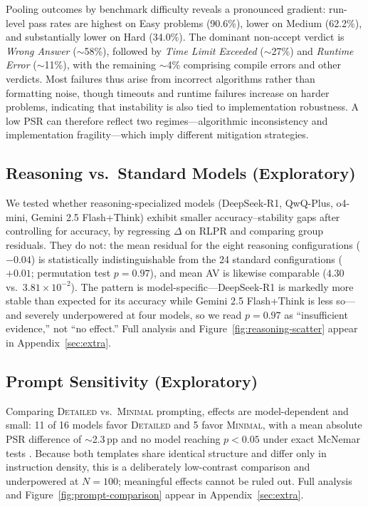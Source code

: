 \documentclass{article}
\begin{document}
Pooling outcomes by benchmark difficulty reveals a pronounced gradient: run-level pass rates are highest on Easy problems (90.6\%), lower on Medium (62.2\%), and substantially lower on Hard (34.0\%). The dominant non-accept verdict is \emph{Wrong Answer} ($\sim$58\%), followed by \emph{Time Limit Exceeded} ($\sim$27\%) and \emph{Runtime Error} ($\sim$11\%), with the remaining $\sim$4\% comprising compile errors and other verdicts. Most failures thus arise from incorrect algorithms rather than formatting noise, though timeouts and runtime failures increase on harder problems, indicating that instability is also tied to implementation robustness. A low PSR can therefore reflect two regimes---algorithmic inconsistency and implementation fragility---which imply different mitigation strategies.

\subsection{Reasoning vs.\ Standard Models (Exploratory)}
We tested whether reasoning-specialized models (DeepSeek-R1, QwQ-Plus, o4-mini, Gemini 2.5 Flash+Think) exhibit smaller accuracy--stability gaps after controlling for accuracy, by regressing $\Delta$ on RLPR and comparing group residuals. They do not: the mean residual for the eight reasoning configurations ($-0.04$) is statistically indistinguishable from the 24 standard configurations ($+0.01$; permutation test $p=0.97$), and mean AV is likewise comparable ($4.30$ vs.\ $3.81 \times 10^{-2}$). The pattern is model-specific---DeepSeek-R1 is markedly more stable than expected for its accuracy while Gemini 2.5 Flash+Think is less so---and severely underpowered at four models, so we read $p=0.97$ as ``insufficient evidence,'' not ``no effect.'' Full analysis and Figure~\ref{fig:reasoning-scatter} appear in Appendix~\ref{sec:extra}.

\subsection{Prompt Sensitivity (Exploratory)}
Comparing \textsc{Detailed} vs.\ \textsc{Minimal} prompting, effects are model-dependent and small: 11 of 16 models favor \textsc{Detailed} and 5 favor \textsc{Minimal}, with a mean absolute PSR difference of $\sim$2.3\,pp and no model reaching $p<0.05$ under exact McNemar tests \citep{zhuo2024prosa}. Because both templates share identical structure and differ only in instruction density, this is a deliberately low-contrast comparison and underpowered at $N=100$; meaningful effects cannot be ruled out. Full analysis and Figure~\ref{fig:prompt-comparison} appear in Appendix~\ref{sec:extra}.
\end{document}
